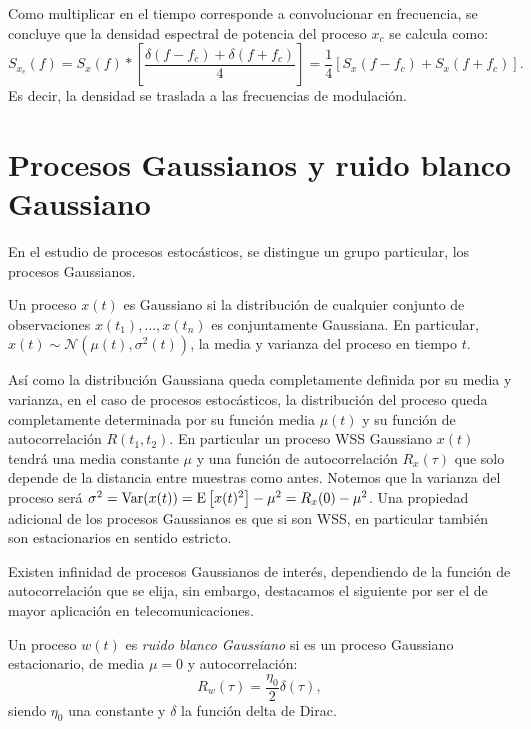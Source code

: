 Como multiplicar en el tiempo corresponde a convolucionar en frecuencia, se concluye que la densidad espectral de potencia del proceso $x_c$ se calcula como:
\begin{equation}\label{eq:dep modulacion}
    S_{x_c}(f) = S_x(f) *\left[\frac{\delta(f-f_c) + \delta(f+f_c)}{4}\right] = \frac{1}{4}\left[S_x(f-f_c) + S_x(f+f_c)\right].
\end{equation}
Es decir, la densidad se traslada a las frecuencias de modulación.

\section{Procesos Gaussianos y ruido blanco Gaussiano}\label{sec:gaussian}

En el estudio de procesos estocásticos, se distingue un grupo particular, los procesos Gaussianos.

\begin{definicion}
    Un proceso $x(t)$ es Gaussiano si la distribución de cualquier conjunto de observaciones $x(t_1),\dots,x(t_n)$ es conjuntamente Gaussiana. En particular, $x(t)\sim \mathcal{N}(\mu(t),\sigma^2(t))$, la media y varianza del proceso en tiempo $t$.
\end{definicion}

Así como la distribución Gaussiana queda completamente definida por su media y varianza, en el caso de procesos estocásticos, la distribución del proceso queda completamente determinada por su función media $\mu(t)$ y su función de autocorrelación $R(t_1,t_2)$. En particular un proceso WSS Gaussiano $x(t)$ tendrá una media constante $\mu$ y una función de autocorrelación $R_x(\tau)$ que solo depende de la distancia entre muestras como antes. Notemos que la varianza del proceso será $\sigma^2 = \operatorname{Var}(x(t)) = \mathrm{E}\left[x(t)^2\right]-\mu^2 = R_x(0)-\mu^2$. Una propiedad adicional de los procesos Gaussianos es que si son WSS, en particular también son estacionarios en sentido estricto.

Existen infinidad de procesos Gaussianos de interés, dependiendo de la función de autocorrelación que se elija, sin embargo, destacamos el siguiente por ser el de mayor aplicación en telecomunicaciones.

\begin{definicion}
Un proceso $w(t)$ es \emph{ruido blanco Gaussiano} si es un proceso Gaussiano estacionario, de media $\mu=0$ y autocorrelación:
\begin{equation*}
    R_w(\tau) = \frac{\eta_0}{2} \delta(\tau),
\end{equation*}
siendo $\eta_0$ una constante y $\delta$ la función delta de Dirac.
\end{definicion}

